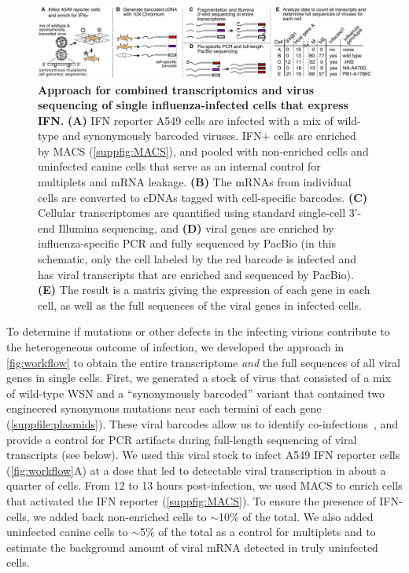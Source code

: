\documentclass[10pt,letterpaper]{article}
\newenvironment{fullwidth}{%
  \begin{adjustwidth}{-2.05in}{}
}{\end{adjustwidth}}
\newcommand{\FIG}[1]{\autoref{fig:#1}}
\newcommand{\SUPPFILE}[1]{\autoref{suppfile:#1}}
\newcommand{\SUPPFIG}[1]{\autoref{suppfig:#1}}
\begin{document}
\begin{figure}
\begin{fullwidth}

\includegraphics[width=\linewidth, valign=t]{figures/WorkflowSchematic/SchematicForPaper.pdf}

\caption{
{\bf Approach for combined transcriptomics and virus sequencing of single influenza-infected cells that express IFN.}
{\bf (A)}
IFN reporter A549 cells are infected with a mix of wild-type and synonymously barcoded viruses.
IFN+ cells are enriched by MACS (\SUPPFIG{MACS}), and pooled with non-enriched cells and uninfected canine cells that serve as an internal control for multiplets and mRNA leakage.
{\bf (B)}
The mRNAs from individual cells are converted to cDNAs tagged with cell-specific barcodes.
{\bf (C)}
Cellular transcriptomes are quantified using standard single-cell 3'-end Illumina sequencing, and 
{\bf (D)}
viral genes are enriched by influenza-specific PCR and fully sequenced by PacBio (in this schematic, only the cell labeled by the red barcode is infected and has viral transcripts that are enriched and sequenced by PacBio).
{\bf (E)}
The result is a matrix giving the expression of each gene in each cell, as well as the full sequences of the viral genes in infected cells.
}
\label{fig:workflow}

\end{fullwidth}
\end{figure}

To determine if mutations or other defects in the infecting virions contribute to the heterogeneous outcome of infection, we developed the approach in \FIG{workflow} to obtain the entire transcriptome \emph{and} the full sequences of all viral genes in single cells.
First, we generated a stock of virus that consisted of a mix of wild-type WSN and a ``synonymously barcoded'' variant that contained two engineered synonymous mutations near each termini of each gene (\SUPPFILE{plasmids}).
These viral barcodes allow us to identify co-infections~\citep{russell2018extreme}, and provide a control for PCR artifacts during full-length sequencing of viral transcripts (see below).
We used this viral stock to infect A549 IFN reporter cells (\FIG{workflow}A) at a dose that led to detectable viral transcription in about a quarter of cells.
From 12 to 13 hours post-infection, we used MACS to enrich cells that activated the IFN reporter (\SUPPFIG{MACS}).
To ensure the presence of IFN- cells, we added back non-enriched cells to $\sim$10\% of the total.
We also added uninfected canine cells to $\sim$5\% of the total as a control for multiplets and to estimate the background amount of viral mRNA detected in truly uninfected cells.
\end{document}
